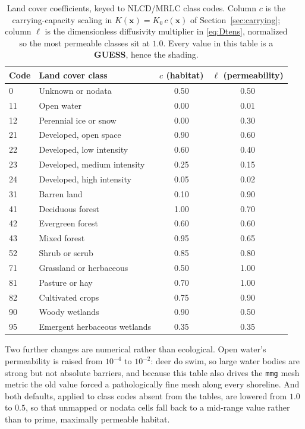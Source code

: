 \documentclass[11pt]{article}
\newcommand{\tagGUESS}{{\footnotesize\textsf{\textbf{\textcolor{red!70!black}{GUESS}}}}}
\begin{document}
\begin{table}[h]
\centering
\small
\caption{Land cover coefficients, keyed to NLCD/MRLC class codes. Column $c$ is the carrying-capacity scaling in $K(\mathbf{x})=K_0\,c(\mathbf{x})$ of Section~\ref{sec:carrying}; column $\ell$ is the dimensionless diffusivity multiplier in \eqref{eq:Dtens}, normalized so the most permeable classes sit at $1.0$. Every value in this table is a \tagGUESS{}, hence the shading.}
\label{tab:landcover-values}
\begin{tabular}{@{}llcc@{}}
\toprule
Code & Land cover class & $c$ (habitat) & $\ell$ (permeability) \\
\midrule
0  & Unknown or nodata            & 0.50 & 0.50 \\
11 & Open water                   & 0.00 & 0.01 \\
12 & Perennial ice or snow        & 0.00 & 0.30 \\
21 & Developed, open space        & 0.90 & 0.60 \\
22 & Developed, low intensity     & 0.60 & 0.40 \\
23 & Developed, medium intensity  & 0.25 & 0.15 \\
24 & Developed, high intensity    & 0.05 & 0.02 \\
31 & Barren land                  & 0.10 & 0.90 \\
41 & Deciduous forest             & 1.00 & 0.70 \\
42 & Evergreen forest             & 0.60 & 0.60 \\
43 & Mixed forest                 & 0.95 & 0.65 \\
52 & Shrub or scrub               & 0.85 & 0.80 \\
71 & Grassland or herbaceous      & 0.50 & 1.00 \\
81 & Pasture or hay               & 0.70 & 1.00 \\
82 & Cultivated crops             & 0.75 & 0.90 \\
90 & Woody wetlands               & 0.90 & 0.50 \\
95 & Emergent herbaceous wetlands & 0.35 & 0.35 \\
\bottomrule
\end{tabular}
\end{table}

Two further changes are numerical rather than ecological. Open water's permeability is raised from $10^{-4}$ to $10^{-2}$: deer do swim, so large water bodies are strong but not absolute barriers, and because this table also drives the \texttt{mmg} mesh metric the old value forced a pathologically fine mesh along every shoreline. And both defaults, applied to class codes absent from the tables, are lowered from $1.0$ to $0.5$, so that unmapped or nodata cells fall back to a mid-range value rather than to prime, maximally permeable habitat.
\end{document}
